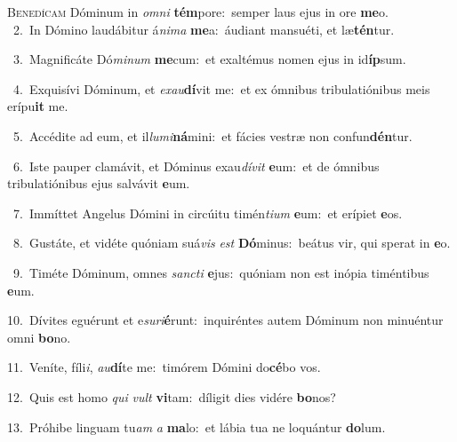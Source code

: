 \lettrine{\initial\textcolor{\initialcolor}{B}}{enedícam} Dóminum in \textit{om}\-\textit{ni} \textbf{tém}\-pore:~\star semper laus ejus in ore \textbf{me}\-o.\\
{\numbfont\textcolor{\numbcolor}{~2.}}~In Dómino laudábitur á\-\textit{ni}\-\textit{ma} \textbf{me}\-a:~\star áudiant mansuéti, et læ\-\textbf{tén}\-tur.\par
{\numbfont\textcolor{\numbcolor}{~3.}}~Magnificáte Dó\-\textit{mi}\-\textit{num} \textbf{me}\-cum:~\star et exaltémus nomen ejus in id\-\textbf{íp}\-sum.\par
{\numbfont\textcolor{\numbcolor}{~4.}}~Exquisívi Dóminum, et \textit{ex}\-\textit{au}\textbf{dí}vit me:~\star et ex ómnibus tribulatiónibus meis erípu\textbf{it} me.\par
{\numbfont\textcolor{\numbcolor}{~5.}}~Accédite ad eum, et il\-\textit{lu}\-\textit{mi}\textbf{ná}mini:~\star et fácies vestræ non confun\-\textbf{dén}\-tur.\par
{\numbfont\textcolor{\numbcolor}{~6.}}~Iste pauper clamávit, et Dóminus exau\-\textit{dí}\-\textit{vit} \textbf{e}\-um:~\star et de ómnibus tribulatiónibus ejus salvávit \textbf{e}\-um.\par
{\numbfont\textcolor{\numbcolor}{~7.}}~Immíttet Angelus Dómini in circúitu timén\-\textit{ti}\-\textit{um} \textbf{e}\-um:~\star et erípiet \textbf{e}\-os.\par
{\numbfont\textcolor{\numbcolor}{~8.}}~Gustáte, et vidéte quóniam suá\textit{vis} \textit{est} \textbf{Dó}\-minus:~\star beátus vir, qui sperat in \textbf{e}\-o.\par
{\numbfont\textcolor{\numbcolor}{~9.}}~Timéte Dóminum, omnes \textit{sanc}\-\textit{ti} \textbf{e}\-jus:~\star quóniam non est inópia timéntibus \textbf{e}\-um.\par
{\numbfont\textcolor{\numbcolor}{10.}}~Dívites eguérunt et e\-\textit{su}\-\textit{ri}\textbf{é}runt:~\star inquiréntes autem Dóminum non minuéntur omni \textbf{bo}\-no.\par
{\numbfont\textcolor{\numbcolor}{11.}}~Veníte, fíli\-\textit{i}\-, \textit{au}\-\textbf{dí}te me:~\star timórem Dómini do\-\textbf{cé}\-bo vos.\par
{\numbfont\textcolor{\numbcolor}{12.}}~Quis est homo \textit{qui} \textit{vult} \textbf{vi}\-tam:~\star díligit dies vidére \textbf{bo}\-nos?\par
{\numbfont\textcolor{\numbcolor}{13.}}~Próhibe linguam tu\textit{am} \textit{a} \textbf{ma}\-lo:~\star et lábia tua ne loquántur \textbf{do}\-lum.\par
